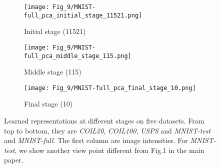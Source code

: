 \documentclass[10pt,twocolumn,letterpaper]{article}
\begin{document}
\begin{figure*}[t]
   \begin{subfigure}{0.33\linewidth}
   \centering
    \texttt{[image: Fig\_9/MNIST-full\_pca\_initial\_stage\_11521.png]}
    \vspace{-5pt}
    \caption{Initial stage (11521)}
       \vspace{20pt}
   \end{subfigure}
   \begin{subfigure}{0.33\linewidth}
   \centering
    \texttt{[image: Fig\_9/MNIST-full\_pca\_middle\_stage\_115.png]}
    \vspace{-5pt}
    \caption{Middle stage (115)}
       \vspace{20pt}
   \end{subfigure}
   \begin{subfigure}{0.33\linewidth}
   \centering
       \texttt{[image: Fig\_9/MNIST-full\_pca\_final\_stage\_10.png]}
   \vspace{-5pt}
   \caption{Final stage (10)}
      \vspace{20pt}
   \end{subfigure}
      \vspace{-5pt}
   \caption{Learned representations at different stages on five datasets. From top to bottom, they are \textit{COIL20}, \textit{COIL100}, \textit{USPS} and \textit{MNIST-test} and \textit{MNIST-full}. The first column are image intensities. For \textit{MNIST-test}, we show another view point different from Fig.1 in the main paper.}
   \label{Fig_PCA_Display_5}
\end{figure*}
\end{document}
